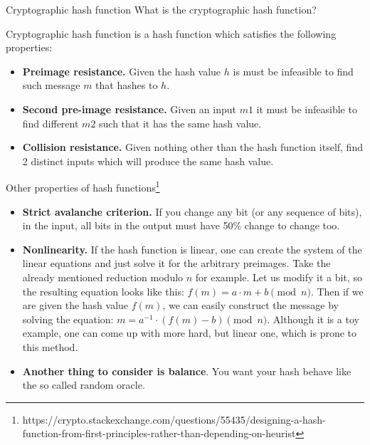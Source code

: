 \documentclass{beamer}
\begin{document}
\begin{frame}{Cryptographic hash function}
    What is the cryptographic hash function?
    \pause
    \begin{definition}
        Cryptographic hash function is a hash function which satisfies the
        following properties:
        \begin{itemize}
            \item \textbf{Preimage resistance.} Given the hash value $h$ is must be
            infeasible to find such message $m$ that hashes to $h$.
            \pause
            \item \textbf{Second pre-image resistance.} Given an input $m1$ it
            must be infeasible to find different $m2$ such that it has the
            same hash value.
            \pause
            \item \textbf{Collision resistance.} Given nothing other than the
            hash function itself, find 2 distinct inputs which will produce the
            same hash value.
        \end{itemize}
    \end{definition}
\end{frame}

\begin{frame}{Other properties of hash functions\footnote{https://crypto.stackexchange.com/questions/55435/designing-a-hash-function-from-first-principles-rather-than-depending-on-heurist}}
    \begin{itemize}
        \item \textbf{Strict avalanche criterion.} If you change any bit (or
        any sequence of bits), in the input, all bits in the output must have
        50\% change to change too.
        \pause
        \item \textbf{Nonlinearity.} If the hash function is linear, one can
        create the system of the linear equations and just solve it for the
        arbitrary preimages. Take the already mentioned reduction modulo $n$
        for example. Let us modify it a bit, so the resulting equation looks
        like this: $f(m) = a \cdot m + b \pmod n$. Then if we are given the
        hash value $f(m)$, we can easily construct the message by solving the
        equation: $m = a^{-1} \cdot (f(m) - b) \pmod n$. Although it is a toy
        example, one can come up with more hard, but linear one, which is prone
        to this method.
        \pause
        \item \textbf{Another thing to consider is balance}. You want your hash behave
        like the so called random oracle.
    \end{itemize}
\end{frame}
\end{document}
